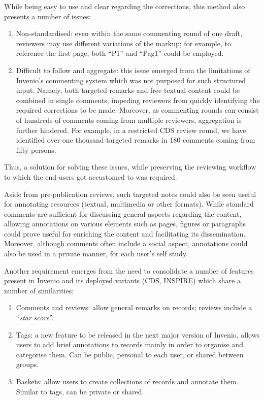 While being easy to use and clear regarding the corrections, this method also
presents a number of issues:
  \begin{enumerate}
    \item Non-standardised: even within the same commenting round of one draft,
      reviewers may use different variations of the markup; for example, to
      reference the first page, both ``P1'' and ``Pag1'' could be employed.
    \item Difficult to follow and aggregate: this issue emerged from the
      limitations of Invenio's commenting system which was not purposed for such
      structured input. Namely, both targeted remarks and free textual content
      could be combined in single comments, impeding reviewers from quickly
      identifying the required corrections to be made. Moreover, as commenting
      rounds can consist of hundreds of comments coming from multiple reviewers,
      aggregation is further hindered. For example, in a restricted CDS review
      round, we have identified over one thousand targeted remarks in 180
      comments coming from fifty persons.
  \end{enumerate}
Thus, a solution for solving these issues, while preserving the reviewing
workflow to which the end-users got accustomed to was required.

Aside from pre-publication reviews, such targeted notes could also be seen
useful for annotating resources (textual, multimedia or other formats). While
standard comments are sufficient for discussing general aspects regarding the
content, allowing annotations on various elements such as pages, figures or
paragraphs could prove useful for enriching the content and facilitating its
dissemination. Moreover, although comments often include a social aspect,
annotations could also be used in a private manner, for each user's self study.

\newpage

Another requirement emerges from the need to consolidate a number of features
present in Invenio and its deployed variants (CDS, INSPIRE) which share a number
of similarities:
\begin{enumerate}
  \item Comments and reviews: allow general remarks on records; reviews include
    a ``\textit{star score}''.
  \item Tags: a new feature to be released in the next major version of Invenio,
    allows users to add brief annotations to records mainly in order to
    organise and categorise them. Can be public, personal to each user, or
    shared between groups.
  \item Baskets: allow users to create collections of records and annotate them.
    Similar to tags, can be private or shared.
\end{enumerate}

